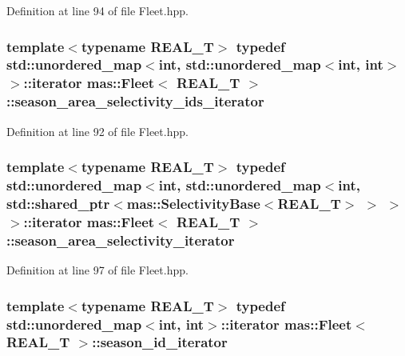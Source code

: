 Definition at line 94 of file Fleet.\-hpp.

\hypertarget{structmas_1_1_fleet_aadb49821d696137325793eec3abdde87}{
\subsubsection[{season\-\_\-area\-\_\-selectivity\-\_\-ids\-\_\-iterator}]{\setlength{\rightskip}{0pt plus 5cm}template$<$typename R\-E\-A\-L\-\_\-\-T$>$ typedef std\-::unordered\-\_\-map$<$int, std\-::unordered\-\_\-map$<$int, int$>$ $>$\-::iterator {\bf mas\-::\-Fleet}$<$ R\-E\-A\-L\-\_\-\-T $>$\-::{\bf season\-\_\-area\-\_\-selectivity\-\_\-ids\-\_\-iterator}}}\label{structmas_1_1_fleet_aadb49821d696137325793eec3abdde87}


Definition at line 92 of file Fleet.\-hpp.

\hypertarget{structmas_1_1_fleet_af276dbe3918638c6bc4556bd97330939}{
\subsubsection[{season\-\_\-area\-\_\-selectivity\-\_\-iterator}]{\setlength{\rightskip}{0pt plus 5cm}template$<$typename R\-E\-A\-L\-\_\-\-T$>$ typedef std\-::unordered\-\_\-map$<$int, std\-::unordered\-\_\-map$<$int, std\-::shared\-\_\-ptr$<${\bf mas\-::\-Selectivity\-Base}$<$R\-E\-A\-L\-\_\-\-T$>$ $>$ $>$ $>$\-::iterator {\bf mas\-::\-Fleet}$<$ R\-E\-A\-L\-\_\-\-T $>$\-::{\bf season\-\_\-area\-\_\-selectivity\-\_\-iterator}}}\label{structmas_1_1_fleet_af276dbe3918638c6bc4556bd97330939}


Definition at line 97 of file Fleet.\-hpp.

\hypertarget{structmas_1_1_fleet_a28ea634c7029c6e00c6362c152d0ac7a}{
\subsubsection[{season\-\_\-id\-\_\-iterator}]{\setlength{\rightskip}{0pt plus 5cm}template$<$typename R\-E\-A\-L\-\_\-\-T$>$ typedef std\-::unordered\-\_\-map$<$int, int$>$\-::iterator {\bf mas\-::\-Fleet}$<$ R\-E\-A\-L\-\_\-\-T $>$\-::{\bf season\-\_\-id\-\_\-iterator}}}\label{structmas_1_1_fleet_a28ea634c7029c6e00c6362c152d0ac7a}


